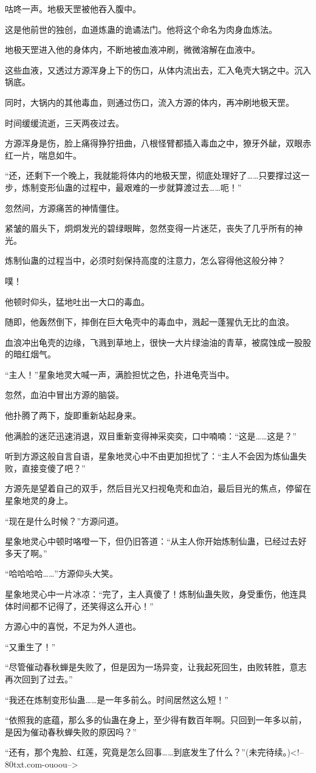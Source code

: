 \begin{this_body}
咕咚一声。地极天罡被他吞入腹中。

这是他前世的独创，血道炼蛊的诡谲法门。他将这个命名为肉身血炼法。

地极天罡进入他的身体内，不断地被血液冲刷，微微溶解在血液中。

这些血液，又透过方源浑身上下的伤口，从体内流出去，汇入龟壳大锅之中。沉入锅底。

同时，大锅内的其他毒血，则通过伤口，流入方源的体内，再冲刷地极天罡。

时间缓缓流逝，三天两夜过去。

方源浑身是伤，脸上痛得狰狞扭曲，八根怪臂都插入毒血之中，獠牙外龇，双眼赤红一片，喘息如牛。

“还，还剩下一个晚上，我就能将体内的地极天罡，彻底处理好了……只要撑过这一步，炼制变形仙蛊的过程中，最艰难的一步就算渡过去……呃！”

忽然间，方源痛苦的神情僵住。

紧皱的眉头下，炯炯发光的碧绿眼眸，忽然变得一片迷茫，丧失了几乎所有的神光。

炼制仙蛊的过程当中，必须时刻保持高度的注意力，怎么容得他这般分神？

噗！

他顿时仰头，猛地吐出一大口的毒血。

随即，他轰然倒下，摔倒在巨大龟壳中的毒血中，溅起一蓬猩仇无比的血浪。

血浪冲出龟壳的边缘，飞溅到草地上，很快一大片绿油油的青草，被腐蚀成一股股的暗红烟气。

“主人！”星象地灵大喊一声，满脸担忧之色，扑进龟壳当中。

忽然，血泊中冒出方源的脑袋。

他扑腾了两下，旋即重新站起身来。

他满脸的迷茫迅速消退，双目重新变得神采奕奕，口中喃喃：“这是……这是？”

听到方源这般自言自语，星象地灵心中不由更加担忧了：“主人不会因为炼仙蛊失败，直接变傻了吧？”

方源先是望着自己的双手，然后目光又扫视龟壳和血泊，最后目光的焦点，停留在星象地灵的身上。

“现在是什么时候？”方源问道。

星象地灵心中顿时咯噔一下，但仍旧答道：“从主人你开始炼制仙蛊，已经过去好多天了啊。”

“哈哈哈哈……”方源仰头大笑。

星象地灵心中一片冰凉：“完了，主人真傻了！炼制仙蛊失败，身受重伤，他连具体时间都不记得了，还笑得这么开心！”

方源心中的喜悦，不足为外人道也。

“又重生了！”

“尽管催动春秋蝉是失败了，但是因为一场异变，让我起死回生，由败转胜，意志再次回到了过去。”

“我还在炼制变形仙蛊……是一年多前么。时间居然这么短！”

“依照我的底蕴，那么多的仙蛊在身上，至少得有数百年啊。只回到一年多以前，是因为催动春秋蝉失败的原因吗？”

“还有，那个鬼脸、红莲，究竟是怎么回事……到底发生了什么？”(未完待续。)<!--80txt.com-ouoou-->

\end{this_body}

